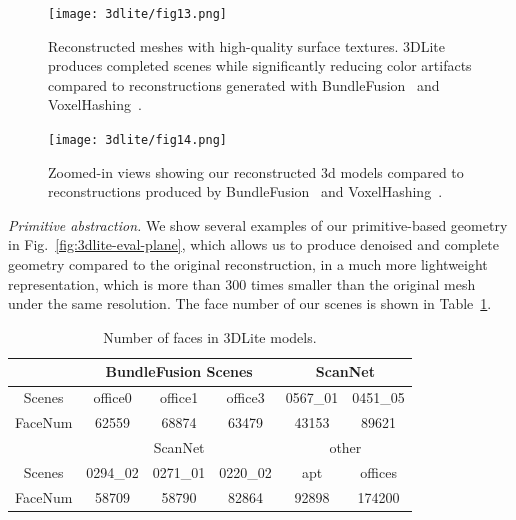 \begin{figure}[!htb]
   \begin{minipage}{0.49\textwidth}
     \centering
	\texttt{[image: 3dlite/fig13.png]}
	\caption{Reconstructed meshes with high-quality surface textures. 
		3DLite produces completed scenes while significantly reducing color artifacts compared to reconstructions generated with BundleFusion~\cite{dai2016bundlefusion} and VoxelHashing~\cite{niessner2013real}.
	}
	\label{fig:3dlite-result-model}
   \end{minipage}\hfill
   \begin{minipage}{0.49\textwidth}
	\texttt{[image: 3dlite/fig14.png]}
	\caption{Zoomed-in views showing our reconstructed 3d models compared to reconstructions produced by BundleFusion~\cite{dai2016bundlefusion} and VoxelHashing~\cite{niessner2013real}.}
	\label{fig:3dlite-result-tex}
   \end{minipage}
\end{figure}


\emph{Primitive abstraction.}
We show several examples of our primitive-based geometry in Fig.~\ref{fig:3dlite-eval-plane}, which allows us to produce denoised and complete geometry compared to the original reconstruction, in a much more lightweight representation, which is more than 300 times smaller than the original mesh under the same resolution. The face number of our scenes is shown in Table~\ref{table:3dlite-face-num}.
\begin{table}
\center
\begin{tabular}{|c|c|c|c|c|c|}
\hline
& \multicolumn{3}{|c|}{BundleFusion Scenes} & \multicolumn{2}{|c|}{ScanNet}\\
\hline
Scenes & office0 & office1 & office3 & 0567\_01 & 0451\_05\\
\hline
FaceNum & 62559 & 68874 & 63479 & 43153 & 89621\\
\hline
\hline
& \multicolumn{3}{|c|}{ScanNet} & \multicolumn{2}{|c|}{other}\\
\hline
Scenes & 0294\_02 & 0271\_01 & 0220\_02 & apt & offices \\
\hline
FaceNum & 58709 & 58790 & 82864 & 92898 & 174200 \\
\hline
\end{tabular}
\caption{Number of faces in 3DLite models.
}
\label{table:3dlite-face-num}
\end{table}

